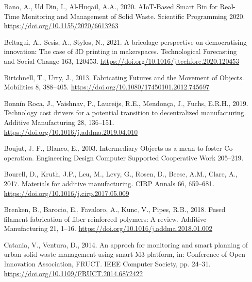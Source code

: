 \documentclass[
  11pt,
]{article}
\newlength{\cslhangindent}
\newlength{\cslentryspacingunit} %
\newenvironment{CSLReferences}[2] %
 {%
  \setlength{\parindent}{0pt}
  \ifodd #1
  \let\oldpar\par
  \def\par{\hangindent=\cslhangindent\oldpar}
  \fi
  \setlength{\parskip}{#2\cslentryspacingunit}
 }%
 {}
\begin{document}
\hypertarget{refs}{}
\begin{CSLReferences}{1}{0}
\leavevmode{}%
Bano, A., Ud Din, I., Al-Huqail, A.A., 2020. {AIoT-Based Smart Bin} for
{Real-Time Monitoring} and {Management} of {Solid Waste}. Scientific
Programming 2020. \url{https://doi.org/10.1155/2020/6613263}

\leavevmode{}%
Beltagui, A., Sesis, A., Stylos, N., 2021. A bricolage perspective on
democratising innovation: {The} case of {3D} printing in makerspaces.
Technological Forecasting and Social Change 163, 120453.
\url{https://doi.org/10.1016/j.techfore.2020.120453}

\leavevmode{}%
Birtchnell, T., Urry, J., 2013. Fabricating {Futures} and the {Movement}
of {Objects}. Mobilities 8, 388--405.
\url{https://doi.org/10.1080/17450101.2012.745697}

\leavevmode{}%
Bonnín Roca, J., Vaishnav, P., Laureijs, R.E., Mendonça, J., Fuchs,
E.R.H., 2019. Technology cost drivers for a potential transition to
decentralized manufacturing. Additive Manufacturing 28, 136--151.
\url{https://doi.org/10.1016/j.addma.2019.04.010}

\leavevmode{}%
Boujut, J.-F., Blanco, E., 2003. Intermediary {Objects} as a mean to
foster {Co-operation}. Engineering Design Computer Supported Cooperative
Work 205--219.

\leavevmode{}%
Bourell, D., Kruth, J.P., Leu, M., Levy, G., Rosen, D., Beese, A.M.,
Clare, A., 2017. Materials for additive manufacturing. CIRP Annals 66,
659--681. \url{https://doi.org/10.1016/j.cirp.2017.05.009}

\leavevmode{}%
Brenken, B., Barocio, E., Favaloro, A., Kunc, V., Pipes, R.B., 2018.
Fused filament fabrication of fiber-reinforced polymers: {A} review.
Additive Manufacturing 21, 1--16.
\url{https://doi.org/10.1016/j.addma.2018.01.002}

\leavevmode{}%
Catania, V., Ventura, D., 2014. An approch for monitoring and smart
planning of urban solid waste management using smart-{M3} platform, in:
Conference of {Open Innovation Association}, {FRUCT}. {IEEE Computer
Society}, pp. 24--31. \url{https://doi.org/10.1109/FRUCT.2014.6872422}


\end{CSLReferences}
\end{document}
